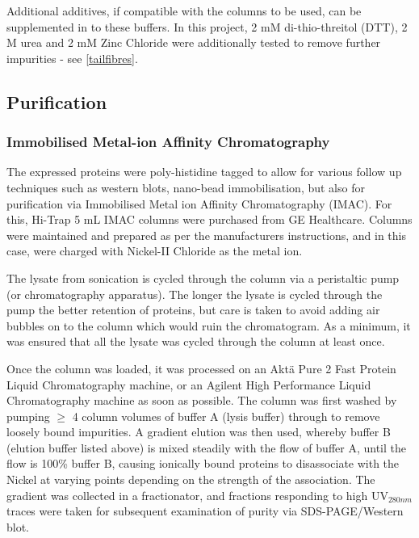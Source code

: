 Additional additives, if compatible with the columns to be used, can be supplemented in to these buffers. In this project, 2 mM di-thio-threitol (DTT), 2 M urea and 2 mM Zinc Chloride were additionally tested to remove further impurities - see \vref{tailfibres}.

\subsection{Purification}
\subsubsection{Immobilised Metal-ion Affinity Chromatography}
The expressed proteins were poly-histidine tagged to allow for various follow up techniques such as western blots, nano-bead immobilisation, but also for purification via Immobilised Metal ion Affinity Chromatography (IMAC). For this, Hi-Trap 5 mL IMAC columns were purchased from GE Healthcare. Columns were maintained and prepared as per the manufacturers instructions, and in this case, were charged with Nickel-II Chloride as the metal ion.

The lysate from sonication is cycled through the column via a peristaltic pump (or chromatography apparatus). The longer the lysate is cycled through the pump the better retention of proteins, but care is taken to avoid adding air bubbles on to the column which would ruin the chromatogram. As a minimum, it was ensured that all the lysate was cycled through the column at least once.

Once the column was loaded, it was processed on an Aktä Pure 2 Fast Protein Liquid Chromatography machine, or an Agilent High Performance Liquid Chromatography machine as soon as possible. The column was first washed by pumping $\geq$ 4 column volumes of buffer A (lysis buffer) through to remove loosely bound impurities. A gradient elution was then used, whereby buffer B (elution buffer listed above) is mixed steadily with the flow of buffer A, until the flow is 100\% buffer B, causing ionically bound proteins to disassociate with the Nickel at varying points depending on the strength of the association. The gradient was collected in a fractionator, and fractions responding to high UV$_{280nm}$ traces were taken for subsequent examination of purity via SDS-PAGE/Western blot.

